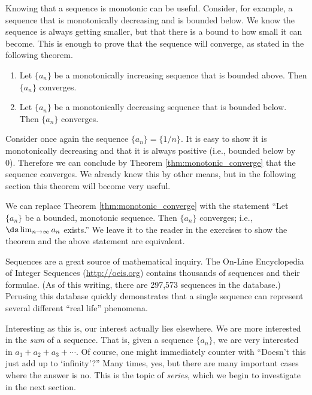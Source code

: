 
Knowing that a sequence is monotonic can be useful. %
Consider, for example, a sequence that is monotonically decreasing and is bounded below. We know the sequence is always getting smaller, but that there is a bound to how small it can become. This is enough to prove that the sequence will converge, as stated in the following theorem.

{\begin{enumerate}
\item		Let $\{a_n\}$ be a monotonically increasing sequence that is bounded above. Then $\{a_n\}$ converges.
\item		Let $\{a_n\}$ be a monotonically decreasing sequence that is bounded below. Then $\{a_n\}$ converges.
\end{enumerate}
}

Consider once again the sequence $\{a_n\} = \{1/n\}$. It is easy to show it is monotonically decreasing and that it is always positive (i.e., bounded below by 0). Therefore we can conclude by Theorem \ref{thm:monotonic_converge} that the sequence converges. We already knew this by other means, but in the following section this theorem will become very useful.

We can replace Theorem \ref{thm:monotonic_converge} with the statement ``Let $\{a_n\}$ be a bounded, monotonic sequence. Then $\{a_n\}$ converges; i.e., $\ds \lim_{n \to\infty}a_n$ exists.'' We leave it to the reader in the exercises to show the theorem and the above statement are equivalent.

Sequences are a great source of mathematical inquiry. The On-Line Encyclopedia of Integer Sequences (\url{http://oeis.org}) contains thousands of sequences and their formulae. (As of this writing, there are 297,573 sequences in the database.) Perusing this database quickly demonstrates that a single sequence can represent several different ``real life'' phenomena. 

Interesting as this is, our interest actually lies elsewhere. We are more interested in the \emph{sum} of a sequence. That is, given a sequence $\{a_n\}$, we are very interested in $a_1+a_2+a_3+\cdots$. Of course, one might immediately counter with ``Doesn't this just add up to `infinity'?'' Many times, yes, but there are many important cases where the answer is no. This is the topic of \emph{series}, which we begin to investigate in the next section.

